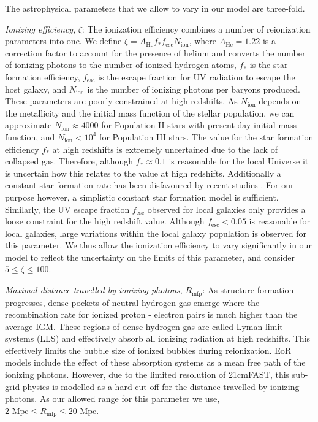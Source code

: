 \documentclass[useAMS,usenatbib]{mnras}
\begin{document}
The astrophysical parameters that we allow to vary in our model are three-fold. 

\textit{Ionizing efficiency}, $\zeta$: The ionization efficiency combines a number of reionization parameters into one.
We define $\zeta = A_\text{He}f_* f_\text{esc} N_\text{ion}$, where $A_\text{He} = 1.22$ is a correction factor to account for the presence of helium and converts the number of ionizing photons to the number of ionized hydrogen atoms, $f_*$ is the star formation efficiency, $f_\text{esc}$ is the escape fraction for UV radiation to escape the host galaxy, and $N_\text{ion}$ is the number of ionizing photons per baryons produced. 
These parameters are poorly constrained at high redshifts.
As $N_\text{ion}$ depends on the metallicity and the initial mass function of the stellar population, we can approximate $N_\text{ion} \approx 4000$ for Population II stars with present day initial mass function, and $N_\text{ion} < 10^4$ for Population III stars. 
The value for the star formation efficiency $f_*$ at high redshifts is extremely uncertained due to the lack of collapsed gas. 
Therefore, although $f_* \approx 0.1$ is reasonable for the local Universe it is uncertain how this relates to the value at high redshifts. 
Additionally a constant star formation rate has been disfavoured by recent studies \citep{Mason2015,Mashian2015a,Furlanetto2017}.
For our purpose however, a simplistic constant star formation model is sufficient.
Similarly, the UV escape fraction $f_\text{esc}$ observed for local galaxies only provides a loose constraint for the high redshift value. 
Although $f_\text{esc} < 0.05$ is reasonable for local galaxies, large variations within the local galaxy population is observed for this parameter.
We thus allow the ionization efficiency to vary significantly in our model to reflect the uncertainty on the limits of this parameter, and consider $5 \leq \zeta \leq 100$. 

\textit{Maximal distance travelled by ionizing photons}, $R_\text{mfp}$: As structure formation progresses, dense pockets of neutral hydrogen gas emerge where the recombination rate for ionized proton - electron pairs is much higher than the average IGM. 
These regions of dense hydrogen gas are called Lyman limit systems (LLS) and effectively absorb all ionizing radiation at high redshifts. 
This effectively limits the bubble size of ionized bubbles during reionization.
EoR models include the effect of these absorption systems as a mean free path of the ionizing photons. 
However, due to the limited resolution of 21cmFAST, this sub-grid physics is modelled as a hard cut-off for the distance travelled by ionizing photons. 
As our allowed range for this parameter we use, $2 \text{ Mpc} \leq R_\text{mfp} \leq 20 \text{ Mpc}$.
\end{document}
